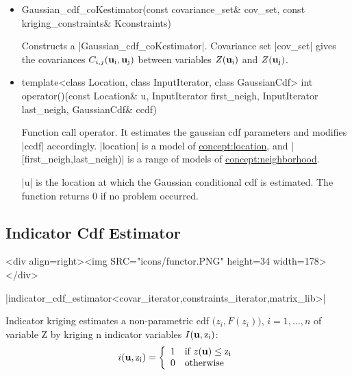\documentclass[12pt,twoside]{report}
\newcommand{\mloc}[1]{\rm{\bf #1}}
\begin{document}
\begin{itemize}

\item
 \begin{code} 
Gaussian_cdf_coKestimator(const covariance_set& cov_set,
                          const kriging_constraints& Kconstraints)
\end{code}

Constructs a |Gaussian_cdf_coKestimator|. Covariance set |cov_set| gives the covariances $C_{i,j}(\mloc{u}_i,\mloc{u}_j)$ between variables $Z(\mloc{u}_i)$ and $Z(\mloc{u}_j)$.


\item
 \begin{code}
template<class Location, class InputIterator, class GaussianCdf> 
int operator()(const Location& u,
             InputIterator first_neigh, InputIterator last_neigh,
             GaussianCdf& ccdf)
             
\end{code}

Function call operator. It estimates the gaussian cdf parameters and modifies |ccdf| accordingly. 
|location| is a model of \hyperref{Location}{Location (see Section}{)}{concept:location}, and |[first_neigh,last_neigh)| is a range of models of \hyperref{Neighborhood}{Neighborhood (see Section}{)}{concept:neighborhood}. 

|u| is the location at which the Gaussian conditional cdf is estimated. 
The function returns 0 if no problem occurred.
\end{itemize}









\subsection{Indicator Cdf Estimator}
\begin{htmlonly}
<div align=right><img SRC="icons/functor.PNG" height=34 width=178></div>
\end{htmlonly}

|indicator_cdf_estimator<covar_iterator,constraints_iterator,matrix_lib>|
\vspace{0.3cm}


Indicator kriging estimates a non-parametric cdf $\Big( z_i, F(z_i) \Big)$, $i=1,\ldots,n$ of variable Z by kriging n indicator variables $I(\mloc{u},z_i)$:
 \begin{displaymath}
  i(\mloc{u},z_i)= \left\{ \begin{array}{ll}
    1 & \textrm{if } z(\mloc{u}) \le z_i \\
    0 & \textrm{otherwise}
\end{array} \right.
\end{displaymath}
\end{document}
